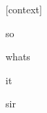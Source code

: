 \documentclass[varwidth]{standalone}
\begin{document}
\begin{CJK*}{UTF8}{gbsn}
{\setlength{\fboxsep}{0pt}\colorbox{white!0}{\parbox{0.9\textwidth}{
\colorbox{red!1.7696510923315145e-09}{\strut [context]} \colorbox{red!0.003540347795933485}{\strut so} \colorbox{red!0.7177164554595947}{\strut whats} \colorbox{red!18.36554527282715}{\strut it} \colorbox{red!80.91320037841797}{\strut sir} 
}}}
\end{CJK*}
\end{document}
